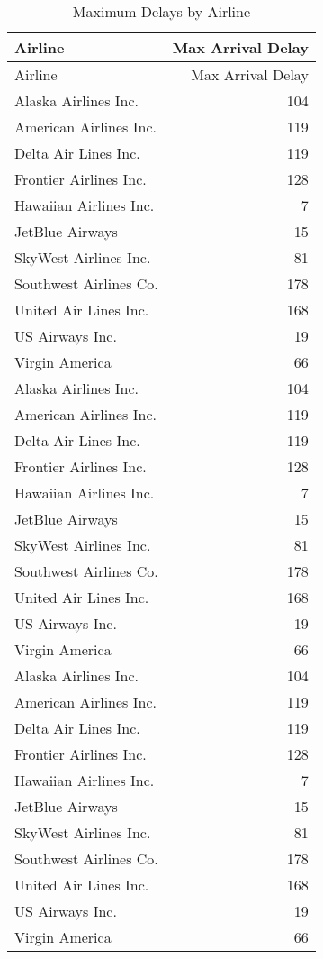 \documentclass{article}
\begin{document}
\begin{longtable}[]{@{}lr@{}}
\caption{\label{tab:maxdelays}Maximum Delays by Airline}\tabularnewline
\toprule
Airline & Max Arrival Delay \\
\midrule
\endfirsthead
\toprule
Airline & Max Arrival Delay \\
\midrule
\endhead
Alaska Airlines Inc. & 104 \\
American Airlines Inc. & 119 \\
Delta Air Lines Inc. & 119 \\
Frontier Airlines Inc. & 128 \\
Hawaiian Airlines Inc. & 7 \\
JetBlue Airways & 15 \\
SkyWest Airlines Inc. & 81 \\
Southwest Airlines Co. & 178 \\
United Air Lines Inc. & 168 \\
US Airways Inc. & 19 \\
Virgin America & 66 \\
Alaska Airlines Inc. & 104 \\
American Airlines Inc. & 119 \\
Delta Air Lines Inc. & 119 \\
Frontier Airlines Inc. & 128 \\
Hawaiian Airlines Inc. & 7 \\
JetBlue Airways & 15 \\
SkyWest Airlines Inc. & 81 \\
Southwest Airlines Co. & 178 \\
United Air Lines Inc. & 168 \\
US Airways Inc. & 19 \\
Virgin America & 66 \\
Alaska Airlines Inc. & 104 \\
American Airlines Inc. & 119 \\
Delta Air Lines Inc. & 119 \\
Frontier Airlines Inc. & 128 \\
Hawaiian Airlines Inc. & 7 \\
JetBlue Airways & 15 \\
SkyWest Airlines Inc. & 81 \\
Southwest Airlines Co. & 178 \\
United Air Lines Inc. & 168 \\
US Airways Inc. & 19 \\
Virgin America & 66 \\

\end{longtable}
\end{document}

